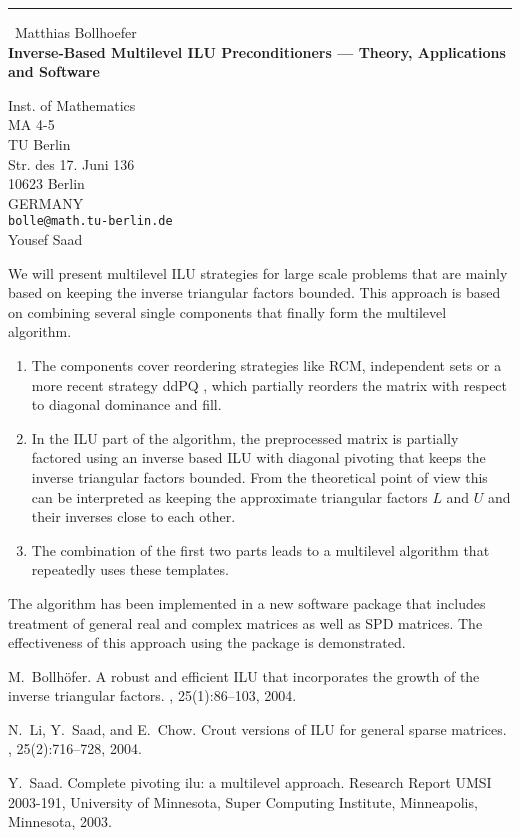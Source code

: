 \documentclass{report}
\begin{document}
\begin{center}
\rule{6in}{1pt} \
{\large Matthias Bollhoefer \\
{\bf Inverse-Based Multilevel ILU Preconditioners --- Theory, Applications and Software}}

Inst. of Mathematics \\ MA 4-5 \\ TU Berlin \\ Str. des 17. Juni 136 \\ 10623 Berlin \\ GERMANY
\\
{\tt bolle@math.tu-berlin.de}\\
Yousef Saad\end{center}

We will present multilevel ILU strategies for large scale
problems that are mainly based
on keeping the inverse triangular factors bounded.
This approach is based on combining several single components
that finally form the multilevel algorithm.

\begin{enumerate}
\item
The components cover reordering strategies like RCM, independent
sets or a more recent strategy ddPQ \cite{Saa03a}, which partially reorders
the matrix with respect to diagonal dominance and fill.
\item
In the ILU part of the algorithm, the preprocessed matrix is partially
factored using
an inverse based ILU \cite{Bol03a,LiSC03} with diagonal
pivoting that keeps the inverse triangular
factors bounded. From the theoretical point of view this
can be interpreted as keeping the approximate
triangular factors $L$ and $U$
and their inverses close to each other.
\item The combination of the first two parts leads to a multilevel
algorithm that repeatedly uses these templates.
\end{enumerate}

The algorithm has been implemented in a new software package that includes
treatment of general real and complex matrices as well
as SPD matrices.
The effectiveness of this approach using the package is demonstrated.

\begin{thebibliography}{1}

M.~Bollh\"ofer.
\newblock A robust and efficient {I}{L}{U} that incorporates the growth of the
inverse triangular factors.
, 25(1):86--103, 2004.

N.~Li, Y.~Saad, and E.~Chow.
\newblock Crout versions of {I}{L}{U} for general sparse matrices.
\newblock {\em {SIAM} J. Sci. Comput.}, 25(2):716--728, 2004.

Y.~Saad.
\newblock Complete pivoting ilu: a multilevel approach.
\newblock Research Report UMSI 2003-191, University of Minnesota, Super
Computing Institute, Minneapolis, Minnesota, 2003.

\end{thebibliography}
\end{document}

